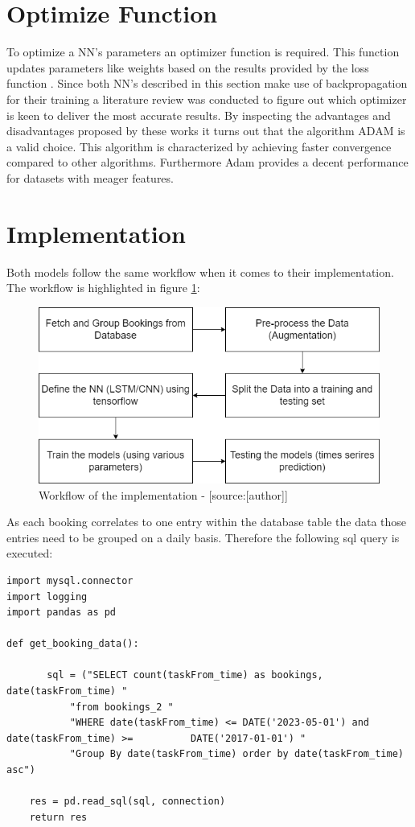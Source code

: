 \section{Optimize Function}
\label{sec:optimize_func}
To optimize a NN's parameters an optimizer function is required. This function updates parameters like weights based on the results provided by the loss function \cite{optimizer}. Since both NN's described in this section make use of backpropagation for their training a literature review was conducted to figure out which optimizer is keen to deliver the most accurate results. By inspecting the advantages and disadvantages proposed by these works \cite{optimizer}\cite{optimizer_1}\cite{optimizer_2} it turns out that the algorithm ADAM is a valid choice. This algorithm is characterized by achieving faster convergence compared to other algorithms. Furthermore Adam provides a decent performance for datasets with meager features.

\section{Implementation}
\label{sec:implementation}
Both models follow the same workflow when it comes to their implementation. The workflow is highlighted in figure \ref{fig:workflow}:

\begin{figure}[H]
	\centering
		\includegraphics[width=12cm]{images/workflow_imp}
	\caption{Workflow of the implementation - [source:[author]]}
	\label{fig:workflow}
\end{figure}

As each booking correlates to one entry within the database table the data those entries need to be grouped on a daily basis. Therefore the following sql query is executed: 
\begin{lstlisting}
import mysql.connector
import logging
import pandas as pd

def get_booking_data():

       sql = ("SELECT count(taskFrom_time) as bookings, date(taskFrom_time) "
           "from bookings_2 "
           "WHERE date(taskFrom_time) <= DATE('2023-05-01') and date(taskFrom_time) >= 			DATE('2017-01-01') "
           "Group By date(taskFrom_time) order by date(taskFrom_time) asc")

    res = pd.read_sql(sql, connection)
    return res
\end{lstlisting}

